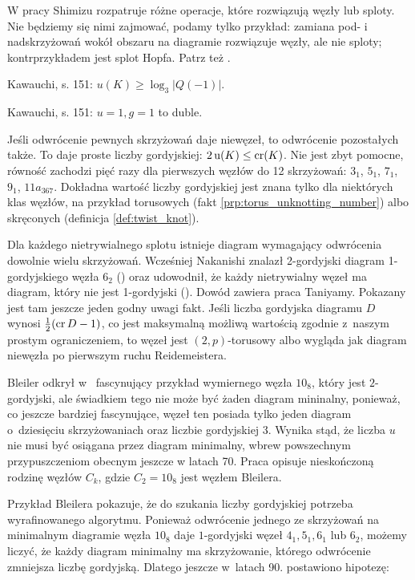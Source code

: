 W pracy \cite{shimizu14} Shimizu rozpatruje różne operacje, które rozwiązują węzły lub sploty.
Nie będziemy się nimi zajmować, podamy tylko przykład: zamiana pod- i nadskrzyżowań wokół obszaru na diagramie rozwiązuje węzły, ale nie sploty; kontrprzykładem jest splot Hopfa.
Patrz też \cite[s. 141-154]{kawauchi96}.

\begin{tobedone}
    Kawauchi, s. 151: $u(K) \ge \log_3|Q(-1)|$.
\end{tobedone}

\begin{tobedone}
    Kawauchi, s. 151: $u = 1, g = 1$ to duble.
\end{tobedone}

Jeśli odwrócenie pewnych skrzyżowań daje niewęzeł, to odwrócenie pozostałych także.
To daje proste liczby gordyjskiej: $2 \operatorname{u} (K) \le \operatorname{cr} (K)$.
Nie jest zbyt pomocne, równość zachodzi pięć razy dla pierwszych węzłów do 12 skrzyżowań: $3_{1}$, $5_{1}$, $7_{1}$, $9_{1}$, $11a_{367}$.
Dokładna wartość liczby gordyjskiej jest znana tylko dla niektórych klas węzłów, na przykład torusowych (fakt \ref{prp:torus_unknotting_number}) albo skręconych (definicja \ref{def:twist_knot}).

Dla każdego nietrywialnego splotu istnieje diagram wymagający odwrócenia dowolnie wielu skrzyżowań.
Wcześniej Nakanishi znalazł 2-gordyjski diagram 1-gordyjskiego węzła $6_2$ (\cite{nakanishi83}) oraz udowodnił, że każdy nietrywialny węzeł ma diagram, który nie jest 1-gordyjski (\cite{nakanishi96}).
Dowód zawiera praca \cite{taniyama09} Taniyamy.
Pokazany jest tam jeszcze jeden godny uwagi fakt.
Jeśli liczba gordyjska diagramu $D$ wynosi $\frac 12 (\operatorname{cr} D - 1)$, co jest maksymalną możliwą wartością zgodnie z~naszym prostym ograniczeniem,
to węzeł jest $(2,p)$-torusowy albo wygląda jak diagram niewęzła po pierwszym ruchu Reidemeistera.

Bleiler odkrył w~\cite{bleiler84} fascynujący przykład wymiernego węzła $10_8$, który jest $2$-gordyjski, ale świadkiem tego nie może być żaden diagram mininalny, ponieważ, co jeszcze bardziej fascynujące, węzeł ten posiada tylko jeden diagram o~dziesięciu skrzyżowaniach oraz liczbie gordyjskiej 3.
Wynika stąd, że liczba $u$ nie musi być osiągana przez diagram minimalny, wbrew powszechnym przypuszczeniom obecnym jeszcze w latach 70.
Praca \cite{bernhard94} opisuje nieskończoną rodzinę węzłów $C_k$, gdzie $C_2 = 10_8$ jest węzłem Bleilera.

Przykład Bleilera pokazuje, że do szukania liczby gordyjskiej potrzeba wyrafinowanego algorytmu.
Ponieważ odwrócenie jednego ze skrzyżowań na minimalnym diagramie węzła $10_8$ daje $1$-gordyjski węzeł $4_1, 5_1, 6_1$ lub $6_2$, możemy liczyć, że każdy diagram minimalny ma skrzyżowanie, którego odwrócenie zmniejsza liczbę gordyjską.
Dlatego jeszcze w~latach 90. postawiono hipotezę:

